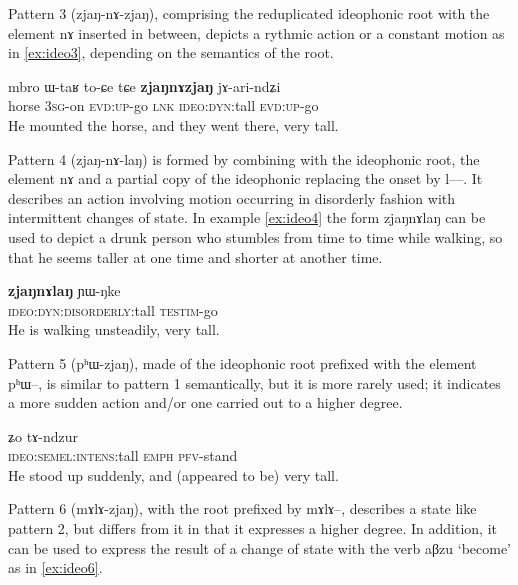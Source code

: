 \documentclass[oldfontcommands,oneside,a4paper,11pt]{article}
\newcommand{\ipa}[1]{{\phon \mbox{#1}}} %
\begin{document}
 Pattern 3 (\ipa{zjaŋ-nɤ-zjaŋ}), comprising the reduplicated ideophonic root with the element \ipa{nɤ} inserted in between, depicts a rythmic action  or a constant motion as in \ref{ex:ideo3}, depending on the semantics of the root.
 
 
 \begin{exe} 
\ex  \label{ex:ideo3}
\gll 
\ipa{mbro}  	\ipa{ɯ-taʁ}  		\ipa{to-ɕe} \ipa{tɕe}   \ipa{\textbf{zjaŋnɤzjaŋ}}  	\ipa{jɤ-ari-ndʑi}  
  \\
horse \textsc{3sg}-on  \textsc{evd:up}-go \textsc{lnk} \textsc{ideo:dyn}:tall  \textsc{evd:up}-go \\
\glt He mounted the horse, and  they went there, very tall.
 \end{exe} 
 
Pattern 4 (\ipa{zjaŋ-nɤ-laŋ}) is formed by combining with the ideophonic root, the element \ipa{nɤ} and a partial copy of the ideophonic replacing the onset by \ipa{l---}. It describes an action involving motion  occurring in disorderly fashion with intermittent changes of state. In example \ref{ex:ideo4} the form  \ipa{zjaŋnɤlaŋ} can be used to depict a drunk person who stumbles from time to time while walking, so that he seems taller at one time and shorter at another time.
 
  \begin{exe} 
\ex  \label{ex:ideo4}
\gll 
 \ipa{\textbf{zjaŋnɤlaŋ}}  	  \ipa{ɲɯ-ŋke}  \\
     \textsc{ideo:dyn:disorderly}:tall   \textsc{testim}-go  \\
\glt He is  walking unsteadily, very tall. 
 \end{exe} 
 
 
 Pattern 5 (\ipa{pʰɯ-zjaŋ}), made of the ideophonic root prefixed with the element \ipa{pʰɯ--}, is similar to pattern 1 semantically, but it is more rarely used; it indicates a more sudden action and/or one carried out to a higher degree.
 
  \begin{exe} 
\ex  \label{ex:ideo5}
\gll \ipa{\textbf{pʰɯzjaŋ}} \ipa{ʑo} 	\ipa{tɤ-ndzur}  \\
\textsc{ideo:semel:intens}:tall \textsc{emph} \textsc{pfv}-stand \\
\glt He stood up suddenly, and (appeared to be) very tall.
\end{exe}

Pattern 6 (\ipa{mɤlɤ-zjaŋ}), with the root prefixed by \ipa{mɤlɤ--}, describes a state like pattern 2, but differs from it in that it expresses a higher degree. In addition, it can be used to express the result of a change of state with the verb \ipa{aβzu} `become' as in \ref{ex:ideo6}.
\end{document}
